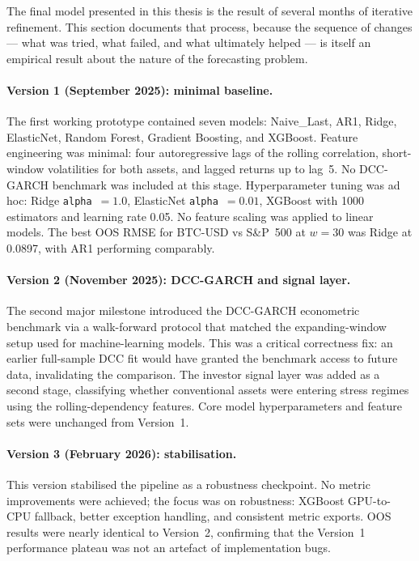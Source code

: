 The final model presented in this thesis is the result of several months of iterative refinement.
This section documents that process, because the sequence of changes --- what was tried,
what failed, and what ultimately helped --- is itself an empirical result about the nature of the
forecasting problem.

\paragraph{Version 1 (September 2025): minimal baseline.}
The first working prototype contained seven models: Naive\_Last, AR1, Ridge, ElasticNet,
Random Forest, Gradient Boosting, and XGBoost.
Feature engineering was minimal: four autoregressive lags of the rolling correlation,
short-window volatilities for both assets, and lagged returns up to lag~5.
No DCC-GARCH benchmark was included at this stage.
Hyperparameter tuning was ad hoc: Ridge \texttt{alpha}~$= 1.0$, ElasticNet \texttt{alpha}~$= 0.01$,
XGBoost with 1000 estimators and learning rate 0.05.
No feature scaling was applied to linear models.
The best OOS RMSE for BTC-USD vs S\&P~500 at $w = 30$ was Ridge at 0.0897,
with AR1 performing comparably.

\paragraph{Version 2 (November 2025): DCC-GARCH and signal layer.}
The second major milestone introduced the DCC-GARCH econometric benchmark via a
walk-forward protocol that matched the expanding-window setup used for machine-learning models.
This was a critical correctness fix: an earlier full-sample DCC fit would have granted the
benchmark access to future data, invalidating the comparison.
The investor signal layer was added as a second stage, classifying whether conventional
assets were entering stress regimes using the rolling-dependency features.
Core model hyperparameters and feature sets were unchanged from Version~1.

\paragraph{Version 3 (February 2026): stabilisation.}
This version stabilised the pipeline as a robustness checkpoint.
No metric improvements were achieved; the focus was on robustness:
XGBoost GPU-to-CPU fallback, better exception handling, and consistent metric exports.
OOS results were nearly identical to Version~2, confirming that the Version~1 performance
plateau was not an artefact of implementation bugs.

